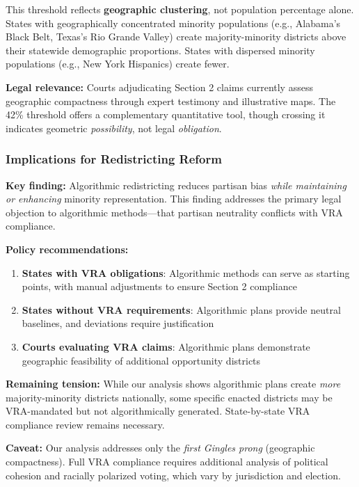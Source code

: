 This threshold reflects \textbf{geographic clustering}, not population percentage alone. States with geographically concentrated minority populations (e.g., Alabama's Black Belt, Texas's Rio Grande Valley) create majority-minority districts above their statewide demographic proportions. States with dispersed minority populations (e.g., New York Hispanics) create fewer.

\textbf{Legal relevance:} Courts adjudicating Section 2 claims currently assess geographic compactness through expert testimony and illustrative maps. The 42\% threshold offers a complementary quantitative tool, though crossing it indicates geometric \emph{possibility}, not legal \emph{obligation}.

\subsubsection{Implications for Redistricting Reform}

\textbf{Key finding:} Algorithmic redistricting reduces partisan bias \emph{while maintaining or enhancing} minority representation. This finding addresses the primary legal objection to algorithmic methods---that partisan neutrality conflicts with VRA compliance.

\textbf{Policy recommendations:}
\begin{enumerate}
    \item \textbf{States with VRA obligations}: Algorithmic methods can serve as starting points, with manual adjustments to ensure Section 2 compliance
    \item \textbf{States without VRA requirements}: Algorithmic plans provide neutral baselines, and deviations require justification
    \item \textbf{Courts evaluating VRA claims}: Algorithmic plans demonstrate geographic feasibility of additional opportunity districts
\end{enumerate}

\textbf{Remaining tension:} While our analysis shows algorithmic plans create \emph{more} majority-minority districts nationally, some specific enacted districts may be VRA-mandated but not algorithmically generated. State-by-state VRA compliance review remains necessary.

\textbf{Caveat:} Our analysis addresses only the \emph{first Gingles prong} (geographic compactness). Full VRA compliance requires additional analysis of political cohesion and racially polarized voting, which vary by jurisdiction and election.
